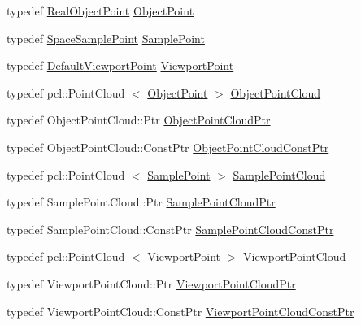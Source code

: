 \begin{DoxyCompactItemize}
\item 
typedef \hyperlink{structnext__best__view_1_1RealObjectPoint}{\-Real\-Object\-Point} \hyperlink{namespacenext__best__view_aa3f3b5e178ddd208eb1d973e44c1fc70}{\-Object\-Point}
\item 
typedef \hyperlink{structnext__best__view_1_1SpaceSamplePoint}{\-Space\-Sample\-Point} \hyperlink{namespacenext__best__view_a56af5e88564f59e1a7cf1e754ad35ff6}{\-Sample\-Point}
\item 
typedef \hyperlink{structnext__best__view_1_1DefaultViewportPoint}{\-Default\-Viewport\-Point} \hyperlink{namespacenext__best__view_adc2a48dc71f39dea04334b16d75a8e34}{\-Viewport\-Point}
\item 
typedef pcl\-::\-Point\-Cloud\*
$<$ \hyperlink{namespacenext__best__view_aa3f3b5e178ddd208eb1d973e44c1fc70}{\-Object\-Point} $>$ \hyperlink{namespacenext__best__view_a8f34dc68b2ea59f714017595a2e0a728}{\-Object\-Point\-Cloud}
\item 
typedef \-Object\-Point\-Cloud\-::\-Ptr \hyperlink{namespacenext__best__view_af8b3b448f67ab117bb7c59bc7c34f0b3}{\-Object\-Point\-Cloud\-Ptr}
\item 
typedef \-Object\-Point\-Cloud\-::\-Const\-Ptr \hyperlink{namespacenext__best__view_a5d5064a7af2a815261264964022c84b8}{\-Object\-Point\-Cloud\-Const\-Ptr}
\item 
typedef pcl\-::\-Point\-Cloud\*
$<$ \hyperlink{namespacenext__best__view_a56af5e88564f59e1a7cf1e754ad35ff6}{\-Sample\-Point} $>$ \hyperlink{namespacenext__best__view_a4e69b847b3bd97988ee2907059ba132e}{\-Sample\-Point\-Cloud}
\item 
typedef \-Sample\-Point\-Cloud\-::\-Ptr \hyperlink{namespacenext__best__view_a6351e8a1adb34a715016b1768ad51120}{\-Sample\-Point\-Cloud\-Ptr}
\item 
typedef \-Sample\-Point\-Cloud\-::\-Const\-Ptr \hyperlink{namespacenext__best__view_a4da3a155b2c3c37ab995df628dbeeafa}{\-Sample\-Point\-Cloud\-Const\-Ptr}
\item 
typedef pcl\-::\-Point\-Cloud\*
$<$ \hyperlink{namespacenext__best__view_adc2a48dc71f39dea04334b16d75a8e34}{\-Viewport\-Point} $>$ \hyperlink{namespacenext__best__view_a072dee7ff4942d17fc1c613b3e25b9d3}{\-Viewport\-Point\-Cloud}
\item 
typedef \-Viewport\-Point\-Cloud\-::\-Ptr \hyperlink{namespacenext__best__view_abcfb9d5ad60ea8ca9414e42d2f61952c}{\-Viewport\-Point\-Cloud\-Ptr}
\item 
typedef \*
\-Viewport\-Point\-Cloud\-::\-Const\-Ptr \hyperlink{namespacenext__best__view_a552a5600ef9c772f22688838bbaffc1b}{\-Viewport\-Point\-Cloud\-Const\-Ptr}

\end{DoxyCompactItemize}
